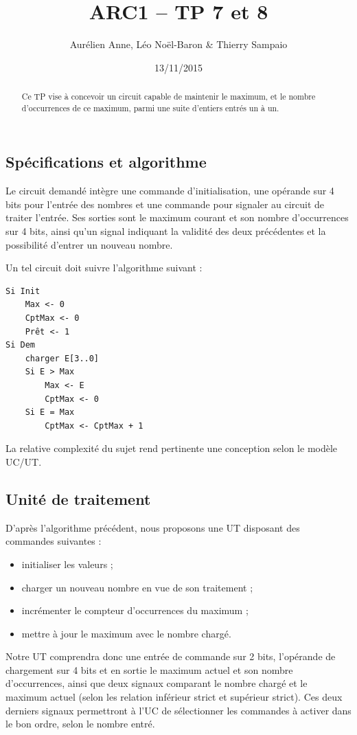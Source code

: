 \documentclass[a4paper,11pt]{article}
\title{ARC1 -- TP 7 et 8}
\author{Aurélien Anne, Léo Noël-Baron \& Thierry Sampaio}
\date{13/11/2015}
\begin{document}
\maketitle

\begin{abstract}
Ce TP vise à concevoir un circuit capable de maintenir le maximum, et le nombre d'occurrences de ce maximum, parmi une suite d'entiers entrés un à un.
\end{abstract}

\subsection*{Spécifications et algorithme}

Le circuit demandé intègre une commande d'initialisation, une opérande sur 4 bits pour l'entrée des nombres et une commande pour signaler au circuit de traiter l'entrée. Ses sorties sont le maximum courant et son nombre d'occurrences sur 4 bits, ainsi qu'un signal indiquant la validité des deux précédentes et la possibilité d'entrer un nouveau nombre.

Un tel circuit doit suivre l'algorithme suivant :
\begin{verbatim}
Si Init
    Max <- 0
    CptMax <- 0
    Prêt <- 1
Si Dem
    charger E[3..0]
    Si E > Max
        Max <- E
        CptMax <- 0
    Si E = Max
        CptMax <- CptMax + 1
\end{verbatim}

La relative complexité du sujet rend pertinente une conception selon le modèle UC/UT.

\subsection*{Unité de traitement}

D'après l'algorithme précédent, nous proposons une UT disposant des commandes suivantes :
\begin{itemize}
  \item initialiser les valeurs ;
  \item charger un nouveau nombre en vue de son traitement ;
  \item incrémenter le compteur d'occurrences du maximum ;
  \item mettre à jour le maximum avec le nombre chargé.
\end{itemize}

Notre UT comprendra donc une entrée de commande sur 2 bits, l'opérande de chargement sur 4 bits et en sortie le maximum actuel et son nombre d'occurrences, ainsi que deux signaux comparant le nombre chargé et le maximum actuel (selon les relation inférieur strict et supérieur strict). Ces deux derniers signaux permettront à l'UC de sélectionner les commandes à activer dans le bon ordre, selon le nombre entré.
\end{document}
